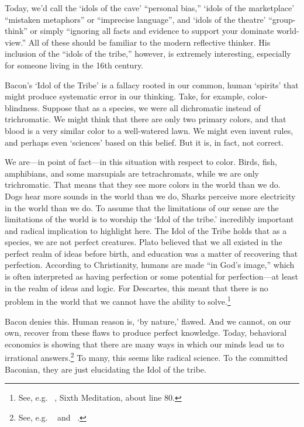 Today, we'd call the `idols of the cave' ``personal bias,'' `idols of the marketplace' ``mistaken metaphors'' or ``imprecise language'', and `idols of the theatre' ``group-think'' or simply ``ignoring all facts and evidence to support your dominate world-view.'' All of these should be familiar to the modern reflective thinker. His inclusion of the ``idols of the tribe,'' however, is extremely interesting, especially for someone living in the 16th century. 

Bacon's `Idol of the Tribe' is a fallacy rooted in our common, human `spirits' that might produce systematic error in our thinking. Take, for example, color-blindness. Suppose that as a species, we were all dichromatic instead of trichromatic. We might think that there are only two primary colors, and that blood is a very similar color to a well-watered lawn. We might even invent rules, and perhaps even `sciences' based on this belief. But it is, in fact, not correct.

We are---in point of fact---in this situation with respect to color. Birds, fish, amphibians, and some marsupials are tetrachromats, while we are only trichromatic. That means that they see more colors in the world than we do. Dogs hear more sounds in the world than we do, Sharks perceive more electricity in the world than we do. To assume that the limitations of our sense are the limitations of the world is to worship the `Idol of the tribe.'
 incredibly important and radical implication to highlight here. The Idol of the Tribe holds that as a species, we are not perfect creatures. Plato believed that we all existed in the perfect realm of ideas before birth, and education was a matter of recovering that perfection. According to Christianity, humans are made ``in God's image,'' which is often interpreted as having perfection or some potential for perfection---at least in the realm of ideas and logic. For Descartes, this meant that there is no problem in the world that we cannot have the ability to solve.\footnote{See, e.g. ~\citep{Descartes:ut}, Sixth Meditation, about line 80.} 

Bacon denies this. Human reason is, `by nature,' flawed. And we cannot, on our own, recover from these flaws to produce perfect knowledge. Today, behavioral economics is showing that there are many ways in which our minds lead us to irrational answers.\footnote{See, e.g. ~\citep{Ariely:2008uk} and ~\citep{Kahneman:2011tc}.} To many, this seems like radical science. To the committed Baconian, they are just elucidating the Idol of the tribe.

